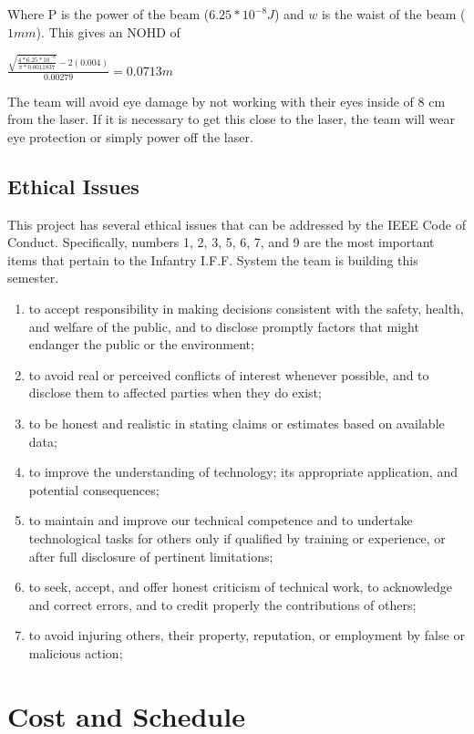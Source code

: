 \documentclass[letterpaper,10pt]{article}
\makeatletter
\newcommand{\skipitems}[1]{%
	\addtocounter{\@enumctr}{#1}%
}
\makeatother
\begin{document}
\begin{spacing}{1.15}
Where P is the power of the beam ($6.25*10^{-8} J$) and $w$ is the waist of the beam ($1mm$). This gives an NOHD of 

{\Large$ \frac{\sqrt{\frac{4 * 6.25*10^{-8}}{\pi * 0.0011837}} - 2(0.004)}{0.00279} = 0.0713 m $}

The team will avoid eye damage by not working with their eyes inside of 8 cm from the laser. If it is necessary to get this close to the laser, the team will wear eye protection or simply power off the laser. 


\subsection{Ethical Issues}
This project has several ethical issues that can be addressed by the IEEE Code of Conduct. Specifically, numbers 1, 2, 3, 5, 6, 7, and 9 are the most important items that pertain to the Infantry I.F.F. System the team is building this semester. 
\begin{enumerate}
\item to accept responsibility in making decisions consistent with the safety, health, and welfare of the public, and to disclose promptly factors that might endanger the public or the environment;
\item to avoid real or perceived conflicts of interest whenever possible, and to disclose them to affected parties when they do exist;
\item to be honest and realistic in stating claims or estimates based on available data;  
\skipitems{1}
\item to improve the understanding of technology; its appropriate application, and potential consequences;  
\item to maintain and improve our technical competence and to undertake technological tasks for others only if qualified by training or experience, or after full disclosure of pertinent limitations;  
\item to seek, accept, and offer honest criticism of technical work, to acknowledge and correct errors, and to credit properly the contributions of others;  
\skipitems{1}
\item to avoid injuring others, their property, reputation, or employment by false or malicious action;  
\end{enumerate}

\clearpage
\section{Cost and Schedule}


\end{spacing}
\end{document}
